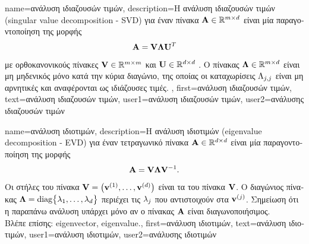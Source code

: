 {name={\foreignlanguage{greek}{ανάλυση ιδιαζουσών τιμών}}, 
  	description={\foreignlanguage{greek}{Η ανάλυση ιδιαζουσών τιμών} 
		(singular value decomposition - SVD) 
  		\foreignlanguage{greek}{για έναν πίνακα ${\bf A} \in \mathbb{R}^{m \times d}$ 
		είναι μία παραγοντοποί\-ηση της μορφής  
		$${\bf A} = \mathbf{V} {\bm \Lambda} \mathbf{U}^{T}$$ 
		με ορθοκανονικούς πίνακες $\mathbf{V} \in \mathbb{R}^{m \times m}$ 
		και} $\mathbf{U} \in \mathbb{R}^{d \times d}$ \cite{GolubVanLoanBook}. 
		\foreignlanguage{greek}{Ο πίνακας ${\bm \Lambda} \in \mathbb{R}^{m \times d}$ είναι 
		μη μηδενικός μόνο κατά την κύρια διαγώνιο, της οποίας οι καταχωρίσεις $\Lambda_{j,j}$ 
		είναι μη αρνητικές και αναφέρονται ως ιδιάζουσες τιμές.} },
	first={\foreignlanguage{greek}{ανάλυση ιδιαζουσών τιμών}},
	text={\foreignlanguage{greek}{ανάλυση ιδιαζουσών τιμών}},
	user1={\foreignlanguage{greek}{ανάλυση ιδιαζουσών τιμών}}, %
	user2={\foreignlanguage{greek}{ανάλυσης ιδιαζουσών τιμών}} %
}

{name={\foreignlanguage{greek}{ανάλυση ιδιοτιμών}}, 
	description={\foreignlanguage{greek}{Η ανάλυση ιδιοτιμών} 
		(eigenvalue decomposition - EVD) \foreignlanguage{greek}{για έναν τετραγωνικό πίνακα ${\bf A} \in \mathbb{R}^{d \times d}$ 
		είναι μία παραγοντοποίηση της μορφής  
		$${\bf A} = \mathbf{V} {\bm \Lambda} \mathbf{V}^{-1}.$$ 
		Οι στήλες του πίνακα $\mathbf{V} = \big( {\bf v}^{(1)}, \ldots, {\bf v}^{(d)} \big)$ είναι τα}  
		 \foreignlanguage{greek}{του πίνακα $\mathbf{V}$. Ο διαγώνιος πίνακας  
		${\bm \Lambda} = {\rm diag} \big\{ \lambda_{1}, \ldots, \lambda_{d} \big\}$ 
		περιέχει τις}  $\lambda_{j}$ \foreignlanguage{greek}{που αντιστοιχούν στα}  
		${\bf v}^{(j)}$. \foreignlanguage{greek}{Σημείωση ότι η παραπάνω ανάλυση υπάρχει μόνο αν ο πίνακας ${\bf A}$ είναι διαγωνοποιήσιμος.} \\
		\foreignlanguage{greek}{Βλέπε επίσης:} \gls{eigenvector}, \gls{eigenvalue}.},
	first={\foreignlanguage{greek}{ανάλυση ιδιοτιμών}},
	text={\foreignlanguage{greek}{ανάλυση ιδιοτιμών}},
	user1={\foreignlanguage{greek}{ανάλυση ιδιοτιμών}}, %
	user2={\foreignlanguage{greek}{ανάλυσης ιδιοτιμών}} %
}

